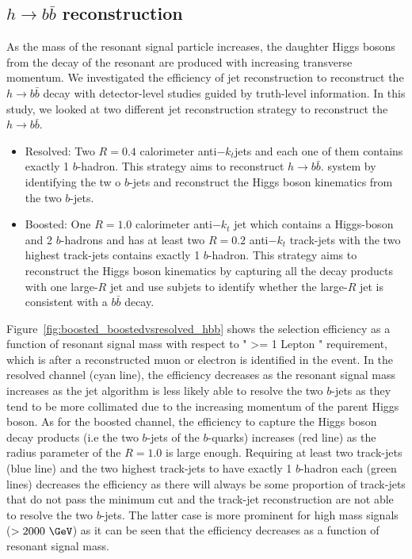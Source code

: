 \subsection{$h \rightarrow b\bar{b}$ reconstruction} 

As the mass of the resonant signal particle increases, the daughter Higgs bosons from the decay of the resonant are produced with increasing
transverse momentum. We investigated the efficiency of jet reconstruction to reconstruct the $h \rightarrow b\bar{b}$ decay with detector-level studies 
guided by truth-level information. In this study, we looked at two different jet reconstruction strategy to reconstruct the $h \rightarrow b\bar{b}$. 
\begin{itemize}
 \item Resolved: Two $R=0.4$ calorimeter anti$-k_t$jets and each one of them contains exactly 1 $b$-hadron. This strategy aims to reconstruct $h \rightarrow b\bar{b}$. 
 system by identifying the tw
 o $b$-jets and reconstruct the Higgs boson kinematics from the two $b$-jets.
 \item Boosted:  One $R=1.0$ calorimeter anti$-k_t$ jet which contains a Higgs-boson and 2 $b$-hadrons and has at least two $R=0.2$ anti$-k_t$  track-jets 
 with the two highest \pt track-jets contains exactly 1 $b$-hadron. This strategy aims to reconstruct the Higgs boson kinematics by capturing all the decay products
 with one large-$R$ jet and use subjets to identify whether the large-$R$ jet is consistent with a $b\bar{b}$ decay.
\end{itemize}

Figure~\ref{fig:boosted_boostedvsresolved_hbb} shows the selection efficiency as a function of resonant signal mass 
with respect to " >= 1 Lepton " requirement,  which is after a reconstructed muon or electron is identified in the event. 
In the resolved channel (cyan line), the efficiency decreases as the resonant signal mass increases as the jet algorithm is less likely able to resolve
the two $b$-jets as they tend to be more collimated due to the increasing momentum of the parent Higgs boson.
As for the boosted channel, the efficiency to capture the Higgs boson decay products (i.e the two $b$-jets of the $b$-quarks) increases (red line) as 
the radius parameter of the $R=1.0$ is large enough. Requiring at least two track-jets (blue line) and the two highest \pt track-jets to have exactly 1 $b$-hadron 
each (green lines) decreases the efficiency as there will always be some proportion of track-jets that do not pass the minimum \pt cut and the track-jet reconstruction
are not able to resolve the two $b$-jets. The latter case is more prominent for high mass signals ($>2000~\GeV$) as it can be seen that the efficiency decreases as a function of resonant signal mass.

